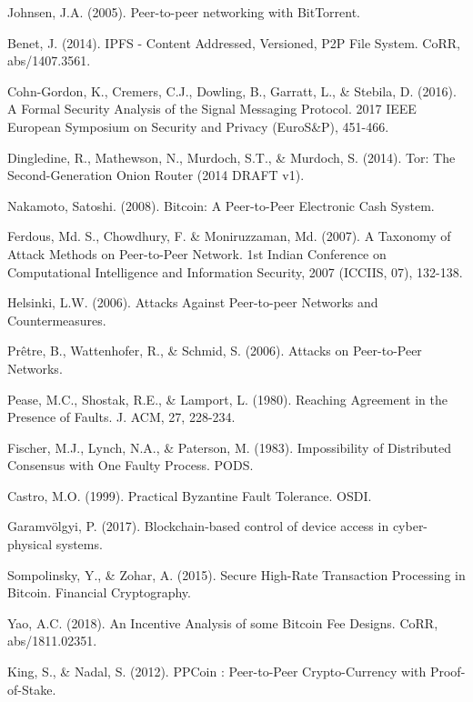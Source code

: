 \documentclass[12pt]{article}
\begin{document}
\begin{thebibliography}{99}

 Johnsen, J.A. (2005). Peer-to-peer networking with BitTorrent.

 Benet, J. (2014). IPFS - Content Addressed, Versioned, P2P File System. CoRR, abs/1407.3561.

 Cohn-Gordon, K., Cremers, C.J., Dowling, B., Garratt, L., \& Stebila, D. (2016). A Formal Security Analysis of the Signal Messaging Protocol. 2017 IEEE European Symposium on Security and Privacy (EuroS\&P), 451-466.

 Dingledine, R., Mathewson, N., Murdoch, S.T., \& Murdoch, S. (2014). Tor: The Second-Generation Onion Router (2014 DRAFT v1).

 Nakamoto, Satoshi. (2008). Bitcoin: A Peer-to-Peer Electronic Cash System.

 Ferdous, Md. S., Chowdhury, F. \& Moniruzzaman, Md. (2007). A Taxonomy of Attack Methods on Peer-to-Peer Network. 1st Indian Conference on Computational Intelligence and Information Security, 2007 (ICCIIS, 07), 132-138.

 Helsinki, L.W. (2006). Attacks Against Peer-to-peer Networks and Countermeasures.

 Prêtre, B., Wattenhofer, R., \& Schmid, S. (2006). Attacks on Peer-to-Peer Networks.

 Pease, M.C., Shostak, R.E., \& Lamport, L. (1980). Reaching Agreement in the Presence of Faults. J. ACM, 27, 228-234.

 Fischer, M.J., Lynch, N.A., \& Paterson, M. (1983). Impossibility of Distributed Consensus with One Faulty Process. PODS.

 Castro, M.O. (1999). Practical Byzantine Fault Tolerance. OSDI.

 Garamvölgyi, P. (2017). Blockchain-based control of device access in cyber-physical systems.

 Sompolinsky, Y., \& Zohar, A. (2015). Secure High-Rate Transaction Processing in Bitcoin. Financial Cryptography.

 Yao, A.C. (2018). An Incentive Analysis of some Bitcoin Fee Designs. CoRR, abs/1811.02351.

 King, S., \& Nadal, S. (2012). PPCoin : Peer-to-Peer Crypto-Currency with Proof-of-Stake.


\end{thebibliography}
\end{document}
